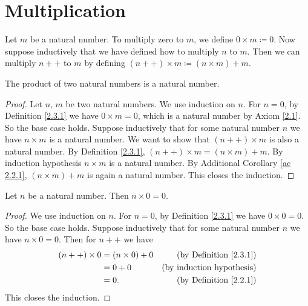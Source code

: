 \section{Multiplication}\label{sec 2.3}

\begin{definition}\label{2.3.1}
    Let \(m\) be a natural number.
    To multiply zero to \(m\), we define \(0 \times m \coloneqq 0\).
    Now suppose inductively that we have defined how to multiply \(n\) to \(m\).
    Then we can multiply \(n++\) to \(m\) by defining \((n++) \times m \coloneqq (n \times m) + m\).
\end{definition}

\begin{additional corollary}\label{ac 2.3.1}
The product of two natural numbers is a natural number.
\end{additional corollary}

\begin{proof}
    Let \(n\), \(m\) be two natural numbers.
    We use induction on \(n\).
    For \(n = 0\), by Definition \ref{2.3.1} we have \(0 \times m = 0\), which is a natural number by Axiom \ref{2.1}.
    So the base case holds.
    Suppose inductively that for some natural number \(n\) we have \(n \times m\) is a natural number.
    We want to show that \((n++) \times m\) is also a natural number.
    By Definition \ref{2.3.1}, \((n++) \times m = (n \times m) + m\).
    By induction hypothesis \(n \times m\) is a natural number.
    By Additional Corollary \ref{ac 2.2.1}, \((n \times m) + m\) is again a natural number.
    This closes the induction.
\end{proof}

\begin{additional corollary}\label{ac 2.3.2}
Let \(n\) be a natural number.
Then \(n \times 0 = 0\).
\end{additional corollary}

\begin{proof}
    We use induction on \(n\).
    For \(n = 0\), by Definition \ref{2.3.1} we have \(0 \times 0 = 0\).
    So the base case holds.
    Suppose inductively that for some natural number \(n\) we have \(n \times 0 = 0\).
    Then for \(n++\) we have
    \begin{align*}
        (n++) \times 0 & = (n \times 0) + 0 & \text{(by Definition \ref{2.3.1})} \\
                       & = 0 + 0            & \text{(by induction hypothesis)}   \\
                       & = 0.               & \text{(by Definition \ref{2.2.1})}
    \end{align*}
    This closes the induction.
\end{proof}

